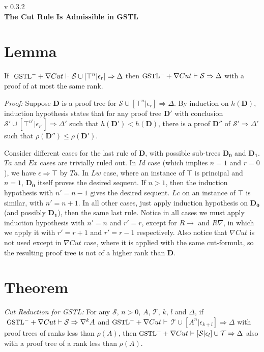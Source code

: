 \documentclass[a4paper, 12pt]{paper}
\begin{document}
{\noindent
	v 0.3.2 \\
{\large\textbf{The Cut Rule Is Admissible in GSTL}}
}
\\
\setcounter{section}{-1}



\section{Lemma}\label{true-assum} If $~\small\text{GSTL}^- + \nabla Cut \vdash \mathcal{S} \cup [\top^n | \epsilon_r] \Rightarrow \Delta$ then $\small\text{GSTL}^- + \nabla Cut \vdash \mathcal{S} \Rightarrow \Delta$ with a proof of at most the same rank.

\textit{Proof:} Suppose $\mathbf{D}$ is a proof tree for $\mathcal{S} \cup [\top^n | \epsilon_r] \Rightarrow \Delta$. By induction on $h(\mathbf{D})$, induction hypothesis states that for any proof tree $\mathbf{D}'$ with conclusion $\mathcal{S'} \cup [\top^{n'} | \epsilon_{r'}] \Rightarrow \Delta'$ such that $h(\mathbf{D}') < h(\mathbf{D})$, there is a proof $\mathbf{D}''$ of $\mathcal{S}' \Rightarrow \Delta'$ such that $\rho(\mathbf{D}'') \leq \rho(\mathbf{D}')$.

Consider different cases for the last rule of $\mathbf{D}$, with possible sub-trees $\mathbf{D_0}$ and $\mathbf{D_1}$. $Ta$ and $Ex$ cases are trivially ruled out. In $Id$ case (which implies $n = 1$ and $r = 0$), we have $\epsilon \Rightarrow \top$ by $Ta$. In $Lw$ case, where an instance of $\top$ is principal and $n = 1$, $\mathbf{D_0}$ itself proves the desired sequent. If $n > 1$, then the induction hypothesis with $n' = n - 1$ gives the desired sequent. $Lc$ on an instance of $\top$ is similar, with $n' = n + 1$. In all other cases, just apply induction hypothesis on $\mathbf{D_0}$ (and possibly $\mathbf{D_1}$), then the same last rule. Notice in all cases we must apply induction hypothesis with $n' = n$ and $r' = r$, except for $R\rightarrow$ and $R\nabla$, in which we apply it with $r' = r + 1$ and $r' = r - 1$ respectively. Also notice that $\nabla Cut$ is not used except in $\nabla Cut$ case, where it is applied with the same cut-formula, so the resulting proof tree is not of a higher rank than $\mathbf{D}$.

\section{Theorem}\label{cut-admis} \emph{Cut Reduction for GSTL: } For any $\mathcal{S}$, $n>0$, $A$, $\mathcal{T}$, $k$, $l$ and $\Delta$, if $~\small\text{GSTL}^- + \nabla Cut \vdash \mathcal{S} \Rightarrow \nabla^k A$ and $\small\text{GSTL}^- + \nabla Cut \vdash$ $\mathcal{T} \cup [A^n | \epsilon_{k+l}] \Rightarrow \Delta$ with proof trees of ranks less than $\rho(A)$, then
 $\small\text{GSTL}^- + \nabla Cut \vdash [ \mathcal{S} | \epsilon_l ] \cup \mathcal{T} \Rightarrow \Delta$ also with a proof tree of a rank less than $\rho(A)$.
 
\end{document}
